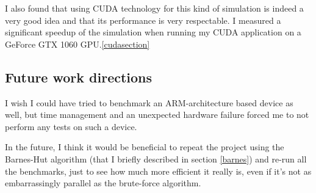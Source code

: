 \documentclass[journal]{IEEEtran}
\begin{document}
		I also found that using CUDA technology for this kind of simulation is indeed a very good idea and that its performance is very respectable. I measured a significant speedup of the simulation when running my CUDA application on a GeForce GTX 1060 GPU.\ref{cudasection}

		\subsection*{Future work directions}	
			
			I wish I could have tried to benchmark an ARM-architecture based device as well, but time management and an unexpected hardware failure forced me to not perform any tests on such a device.
			
			In the future, I think it would be beneficial to repeat the project using the Barnes-Hut algorithm (that I briefly described in section \ref{barnes}) and re-run all the benchmarks, just to see how much more efficient it really is, even if it's not as embarrassingly parallel as the brute-force algorithm.
			
	
	
	
\end{document}
